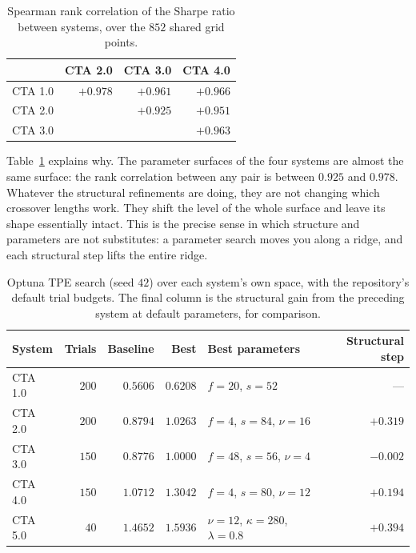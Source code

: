 \documentclass[11pt,a4paper]{article}
\begin{document}
\begin{table}[t]
\centering
\caption{Spearman rank correlation of the Sharpe ratio between systems, over
the $852$ shared grid points.}
\label{tab:rank}
\begin{tabular}{lrrr}
\toprule
& CTA 2.0 & CTA 3.0 & CTA 4.0 \\
\midrule
CTA 1.0 & $+0.978$ & $+0.961$ & $+0.966$ \\
CTA 2.0 &          & $+0.925$ & $+0.951$ \\
CTA 3.0 &          &          & $+0.963$ \\
\bottomrule
\end{tabular}
\end{table}

Table~\ref{tab:rank} explains why. The parameter surfaces of the four systems
are almost the same surface: the rank correlation between any pair is between
$0.925$ and $0.978$. Whatever the structural refinements are doing, they are
not changing which crossover lengths work. They shift the level of the whole
surface and leave its shape essentially intact. This is the precise sense in
which structure and parameters are not substitutes: a parameter search moves
you along a ridge, and each structural step lifts the entire ridge.

\begin{table}[t]
\centering
\caption{Optuna TPE search (seed $42$) over each system's own space, with the
repository's default trial budgets. The final column is the structural gain
from the preceding system at default parameters, for comparison.}
\label{tab:optuna}
\begin{tabular}{lrrrlr}
\toprule
System & Trials & Baseline & Best & Best parameters & Structural step \\
\midrule
CTA 1.0 & $200$ & $0.5606$ & $0.6208$ & $f{=}20$, $s{=}52$ & --- \\
CTA 2.0 & $200$ & $0.8794$ & $1.0263$ & $f{=}4$, $s{=}84$, $\nu{=}16$ & $+0.319$ \\
CTA 3.0 & $150$ & $0.8776$ & $1.0000$ & $f{=}48$, $s{=}56$, $\nu{=}4$ & $-0.002$ \\
CTA 4.0 & $150$ & $1.0712$ & $1.3042$ & $f{=}4$, $s{=}80$, $\nu{=}12$ & $+0.194$ \\
CTA 5.0 & $40$  & $1.4652$ & $1.5936$ & $\nu{=}12$, $\kappa{=}280$, $\lambda{=}0.8$ & $+0.394$ \\
\bottomrule
\end{tabular}
\end{table}
\end{document}
